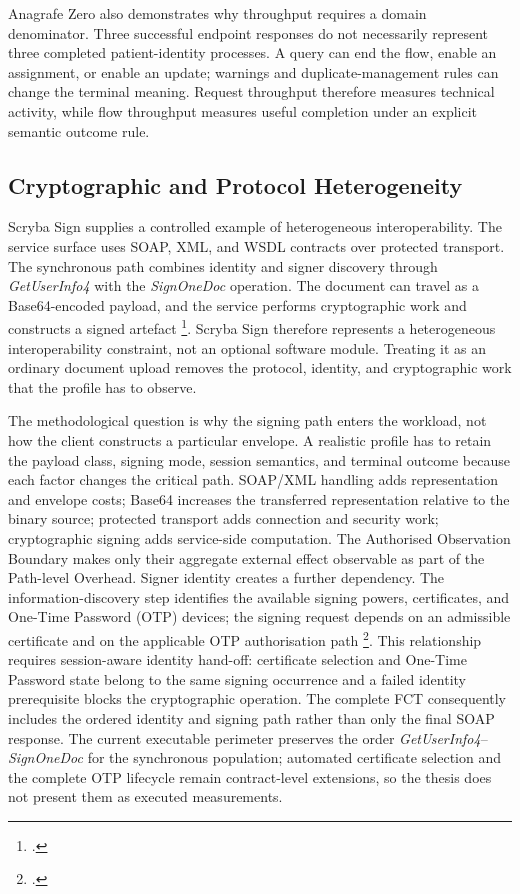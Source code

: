 \noindent Anagrafe Zero also demonstrates why throughput requires a domain denominator.
Three successful endpoint responses do not necessarily represent three completed
patient-identity processes. A query can end the flow, enable an assignment, or
enable an update; warnings and duplicate-management rules can change the terminal
meaning. Request throughput therefore measures technical activity, while flow
throughput measures useful completion under an explicit semantic outcome rule.

\subsection{Cryptographic and Protocol Heterogeneity}

\noindent Scryba Sign supplies a controlled example of heterogeneous
interoperability. The service surface uses SOAP, XML, and WSDL
contracts over protected transport. The synchronous path combines identity and
signer discovery through \emph{GetUserInfo4} with the \emph{SignOneDoc}
operation. The document can travel as a Base64-encoded payload, and the service
performs cryptographic work and constructs a signed artefact
\footcite[pp.~17--18, 91--96, 107--111]{scryba-sign-developer-guide-v16}.
Scryba Sign therefore represents a heterogeneous interoperability constraint,
not an optional software module. Treating it as an ordinary document upload
removes the protocol, identity, and cryptographic work that the profile has to
observe.

\noindent The methodological question is why the signing path enters the workload, not how
the client constructs a particular envelope. A realistic profile has to retain
the payload class, signing mode, session semantics, and terminal outcome because
each factor changes the critical path. SOAP/XML handling adds representation and
envelope costs; Base64 increases the transferred representation relative to the
binary source; protected transport adds connection and security work;
cryptographic signing adds service-side computation. The Authorised Observation
Boundary makes only their aggregate external effect observable as part of the Path-level Overhead. Signer identity creates a further dependency. The information-discovery step
identifies the available signing powers, certificates, and One-Time Password
(OTP) devices; the signing request depends on an admissible certificate and on
the applicable OTP authorisation path
\footcite[pp.~60--62, 91--96]{scryba-sign-developer-guide-v16}. This relationship
requires session-aware identity hand-off: certificate selection and One-Time Password state 
belong to the same signing occurrence and a failed identity prerequisite blocks
the cryptographic operation. The complete FCT consequently includes the ordered
identity and signing path rather than only the final SOAP response. The current
executable perimeter preserves the order \emph{GetUserInfo4}--\emph{SignOneDoc}
for the synchronous population; automated certificate selection and the complete
OTP lifecycle remain contract-level extensions, so the thesis does not present
them as executed measurements.

